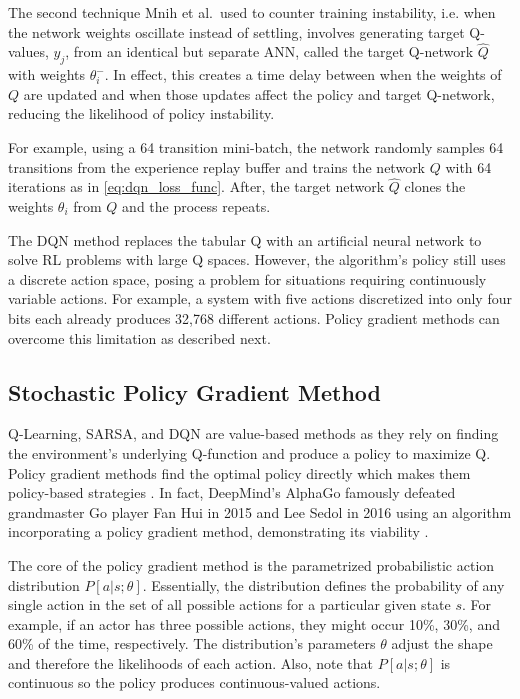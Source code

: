 The second technique Mnih et al.\ used to counter training instability, i.e. when the network weights oscillate instead of settling, involves generating target Q-values, $y_j$, from an identical but separate ANN, called the target Q-network $\hat{Q}$ with weights $\theta^-_i$. In effect, this creates a time delay between when the weights of $Q$ are updated and when those updates affect the policy and target Q-network, reducing the likelihood of policy instability. 

For example, using a 64 transition mini-batch, the network randomly samples 64 transitions from the experience replay buffer and trains the network $Q$ with 64 iterations as in \ref{eq:dqn_loss_func}. After, the target network $\hat{Q}$ clones the weights $\theta_i$ from $Q$ and the process repeats.

The DQN method replaces the tabular Q with an artificial neural network to solve RL problems with large Q spaces. However, the algorithm's policy still uses a discrete action space, posing a problem for situations requiring continuously variable actions. For example, a system with five actions discretized into only four bits each already produces 32,768 different actions. Policy gradient methods can overcome this limitation as described next.

\subsection{Stochastic Policy Gradient Method}
Q-Learning, SARSA, and DQN are value-based methods as they rely on finding the environment's underlying Q-function and produce a policy to maximize Q. Policy gradient methods find the optimal policy directly which makes them policy-based strategies \cite{sutton_policygrad}. In fact, DeepMind's AlphaGo famously defeated grandmaster Go player Fan Hui in 2015 and Lee Sedol in 2016 using an algorithm incorporating a policy gradient method, demonstrating its viability \cite{silver_2017}.

The core of the policy gradient method is the parametrized probabilistic action distribution $P[a|s;\theta]$. Essentially, the distribution defines the probability of any single action in the set of all possible actions for a particular given state $s$. For example, if an actor has three possible actions, they might occur 10\%, 30\%, and 60\% of the time, respectively. The distribution's parameters $\theta$ adjust the shape and therefore the likelihoods of each action. Also, note that $P[a|s;\theta]$ is continuous so the policy produces continuous-valued actions.

